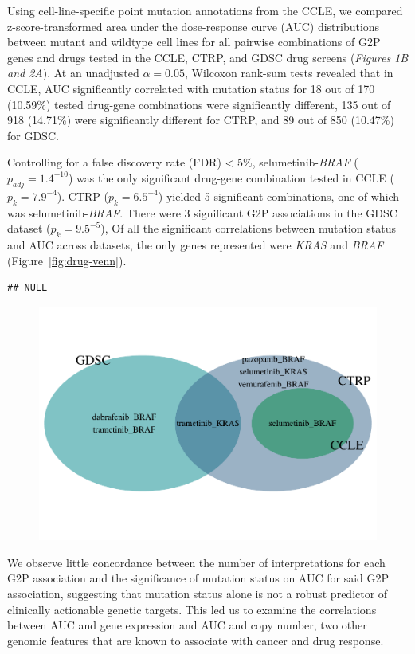 \documentclass[man,floatsintext]{apa6}
\begin{document}
Using cell-line-specific point mutation annotations from the CCLE, we
compared z-score-transformed area under the dose-response curve (AUC)
distributions between mutant and wildtype cell lines for all pairwise
combinations of G2P genes and drugs tested in the CCLE, CTRP, and GDSC
drug screens (\emph{Figures 1B and 2A}). At an unadjusted
\(\alpha = 0.05\), Wilcoxon rank-sum tests revealed that in CCLE, AUC
significantly correlated with mutation status for 18 out of 170
(10.59\%) tested drug-gene combinations were significantly different,
135 out of 918 (14.71\%) were significantly different for CTRP, and 89
out of 850 (10.47\%) for GDSC.

Controlling for a false discovery rate (FDR) \textless{} 5\%,
selumetinib-\emph{BRAF} (\(p_{adj} = 1.4^{-10}\)) was the only
significant drug-gene combination tested in CCLE (\(p_k = 7.9^{-4}\)).
CTRP (\(p_k = 6.5^{-4}\)) yielded 5 significant combinations, one of
which was selumetinib-\emph{BRAF}. There were 3 significant G2P
associations in the GDSC dataset (\(p_k = 9.5^{-5}\)), Of all the
significant correlations between mutation status and AUC across
datasets, the only genes represented were \emph{KRAS} and \emph{BRAF}
(Figure~\ref{fig:drug-venn}).

\begin{verbatim}
## NULL
\end{verbatim}

\begin{figure}
\centering
\includegraphics{manuscript_files/figure-latex/drug-venn-1.pdf}
\caption{}
\end{figure}

We observe little concordance between the number of interpretations for
each G2P association and the significance of mutation status on AUC for
said G2P association, suggesting that mutation status alone is not a
robust predictor of clinically actionable genetic targets. This led us
to examine the correlations between AUC and gene expression and AUC and
copy number, two other genomic features that are known to associate with
cancer and drug response.
\end{document}
